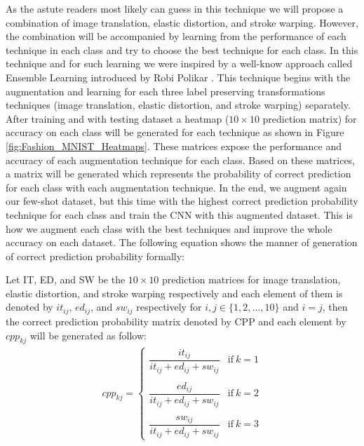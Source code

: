 As the astute readers most likely can guess in this technique we will propose a combination of image
translation, elastic distortion, and stroke warping. However, the combination will be accompanied
by learning from the performance of each technique in each class and try to choose the best
technique for each class. In this technique and for such learning we were inspired by a well-know
approach called Ensemble Learning introduced by Robi Polikar \cite{ensemble_learning}. This technique begins with the
augmentation and learning for each three label preserving transformations techniques (image
translation, elastic distortion, and stroke warping) separately. After training and with testing
dataset a heatmap ($10 \times 10$ prediction matrix) for accuracy on each class will be generated
for each technique as shown in Figure \ref{fig:Fashion_MNIST_Heatmaps}. These matrices expose the
performance and accuracy of each augmentation technique for each class. Based on these matrices, a
matrix will be generated which represents the probability of correct prediction for each class with
each augmentation technique. In the end, we augment again our few-shot dataset, but this time with
the highest correct prediction probability technique for each class and train the CNN with this
augmented dataset. This is how we augment each class with the best techniques and improve the whole
accuracy on each dataset. The following equation shows the manner of generation of correct prediction probability formally:

Let IT, ED, and SW be the $10 \times 10$ prediction matrices for image translation,
elastic distortion, and stroke warping respectively and each element of them is denoted by $it_{ij}$, $ed_{ij}$,
and $sw_{ij}$ respectively for $i,j \in \{1,2,...,10\}$ and $i=j$, then the correct prediction probability
matrix denoted by CPP and each element by $cpp_{kj}$ will be generated as follow:
\begin{equation}
  \begin{aligned}
    cpp_{kj} =
    \begin{cases}
      \dfrac{it_{ij}}{it_{ij} + ed_{ij} + sw_{ij}} & \text{if}\ k=1 \\ \\
      \dfrac{ed_{ij}}{it_{ij} + ed_{ij} + sw_{ij}} & \text{if}\ k=2 \\ \\
      \dfrac{sw_{ij}}{it_{ij} + ed_{ij} + sw_{ij}} & \text{if}\ k=3
    \end{cases}
  \end{aligned}
\end{equation}

